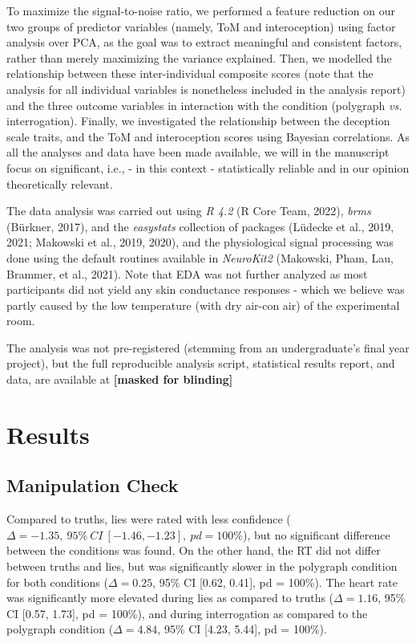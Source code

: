 \documentclass[
  man,mask,floatsintext]{apa6}
\begin{document}
To maximize the signal-to-noise ratio, we performed a feature reduction on our two groups of predictor variables (namely, ToM and interoception) using factor analysis over PCA, as the goal was to extract meaningful and consistent factors, rather than merely maximizing the variance explained. Then, we modelled the relationship between these inter-individual composite scores (note that the analysis for all individual variables is nonetheless included in the analysis report) and the three outcome variables in interaction with the condition (polygraph \emph{vs.} interrogation). Finally, we investigated the relationship between the deception scale traits, and the ToM and interoception scores using Bayesian correlations. As all the analyses and data have been made available, we will in the manuscript focus on significant, i.e., - in this context - statistically reliable and in our opinion theoretically relevant.

The data analysis was carried out using \emph{R 4.2} (R Core Team, 2022), \emph{brms} (Bürkner, 2017), and the \emph{easystats} collection of packages (Lüdecke et al., 2019, 2021; Makowski et al., 2019, 2020), and the physiological signal processing was done using the default routines available in \emph{NeuroKit2} (Makowski, Pham, Lau, Brammer, et al., 2021). Note that EDA was not further analyzed as most participants did not yield any skin conductance responses - which we believe was partly caused by the low temperature (with dry air-con air) of the experimental room.

The analysis was not pre-registered (stemming from an undergraduate's final year project), but the full reproducible analysis script, statistical results report, and data, are available at
\textbf{{[}masked for blinding{]}}

\hypertarget{results}{%
\section{Results}\label{results}}

\hypertarget{manipulation-check}{%
\subsection{Manipulation Check}\label{manipulation-check}}

Compared to truths, lies were rated with less confidence (\(\Delta=-1.35,~95\%~CI~[-1.46, -1.23],~pd = 100\%\)), but no significant difference between the conditions was found. On the other hand, the RT did not differ between truths and lies, but was significantly slower in the polygraph condition for both conditions (\(\Delta=0.25\), 95\% CI {[}0.62, 0.41{]}, pd = 100\%). The heart rate was significantly more elevated during lies as compared to truths (\(\Delta=1.16\), 95\% CI {[}0.57, 1.73{]}, pd = 100\%), and during interrogation as compared to the polygraph condition (\(\Delta=4.84\), 95\% CI {[}4.23, 5.44{]}, pd = 100\%).
\end{document}
